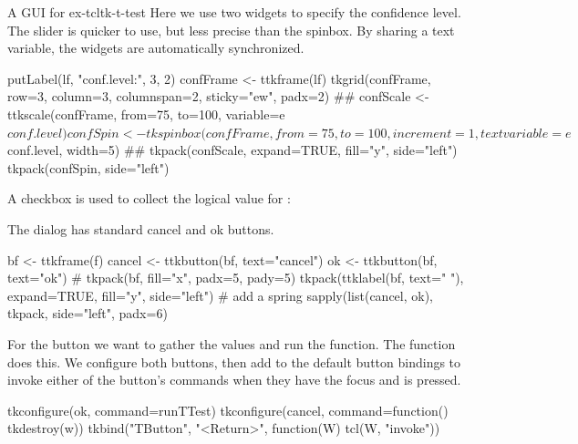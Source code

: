 \begin{example}{A GUI for }{ex-tcltk-t-test}
Here we use two widgets to specify the confidence level. The slider
is quicker to use, but less precise than the spinbox. By sharing a
text variable, the widgets are automatically synchronized.
\begin{Schunk}
\begin{Sinput}
 putLabel(lf, "conf.level:", 3, 2)
 confFrame <- ttkframe(lf)
 tkgrid(confFrame, row=3, column=3, columnspan=2, 
        sticky="ew", padx=2)
 ##
 confScale <- ttkscale(confFrame, from=75, to=100, 
                      variable=e$conf.level)
 confSpin <- tkspinbox(confFrame, from=75, to=100, increment=1, 
                      textvariable=e$conf.level, width=5)
 ##
 tkpack(confScale, expand=TRUE, fill="y", side="left")
 tkpack(confSpin, side="left")
\end{Sinput}
\end{Schunk}

A checkbox is used to collect the logical value for :
\begin{Schunk}
\end{Schunk}


The dialog has standard cancel and ok buttons.
\begin{Schunk}
\begin{Sinput}
 bf <- ttkframe(f)
 cancel <- ttkbutton(bf, text="cancel")
 ok <- ttkbutton(bf, text="ok")
 #
 tkpack(bf, fill="x", padx=5, pady=5)
 tkpack(ttklabel(bf, text=" "), expand=TRUE, fill="y", 
        side="left")                     # add a spring
 sapply(list(cancel, ok), tkpack, side="left", padx=6)
\end{Sinput}
\end{Schunk}
%

For the  button we want to gather the values and run the
function. The  function does this.  We configure both
buttons, then add to the default button bindings to invoke either of the button's commands
when they have the focus and  is pressed.
\begin{Schunk}
\begin{Sinput}
 tkconfigure(ok, command=runTTest)
 tkconfigure(cancel, command=function() tkdestroy(w))
 tkbind("TButton", "<Return>", function(W) tcl(W, "invoke"))
\end{Sinput}
\end{Schunk}


\end{example}

